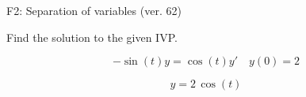 \begin{exercise}
  \begin{exerciseTitle}F2: Separation of variables (ver. 62)\end{exerciseTitle}
  \begin{exerciseStatement}
    
Find the solution to the given IVP.

    
\[-\sin\left(t\right) y= \cos\left(t\right) y'\hspace{1em} y\left( 0 \right)= 2\]

  \end{exerciseStatement}
  \begin{exerciseAnswer}
    
\[y= 2 \, \cos\left(t\right)\]

  \end{exerciseAnswer}
\end{exercise}